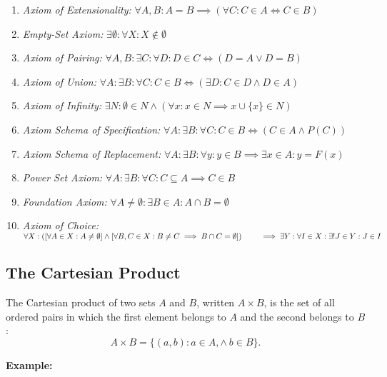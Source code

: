 \begin{enumerate}[label = \Roman*.]
	\item \emph{Axiom of Extensionality:} \quad \(\forall A, B: A = B \implies (\forall C: C \in A \iff C \in B)\)
	\item \emph{Empty-Set Axiom:} \quad \(\exists \emptyset : \forall X: X \notin \emptyset\)
	\item \emph{Axiom of Pairing:} \quad \(\forall A, B: \exists C: \forall D: D \in C \iff (D = A \lor D = B)\)
	\item \emph{Axiom of Union:} \quad \(\forall A: \exists B: \forall C: C \in B \iff (\exists D: C \in D \land D \in A)\)
	\item \emph{Axiom of Infinity:} \quad \(\exists N: \emptyset \in N \land (\forall x: x \in N \implies x \cup \{x\} \in N)\)
	\item \emph{Axiom Schema of Specification:} \quad \(\forall A: \exists B: \forall C: C \in B \iff (C \in A \land P(C))\)
	\item \emph{Axiom Schema of Replacement:} \quad \(\forall A: \exists B: \forall y: y \in B \implies \exists x \in A: y = F(x)\)
	\item \emph{Power Set Axiom:} \quad \(\forall A: \exists B: \forall C: C \subseteq A \implies C \in B\)
	\item \emph{Foundation Axiom:} \quad \(\forall A \ne \emptyset: \exists B \in A: A \cap B = \emptyset\)
	\item \emph{Axiom of Choice:} \quad \(\forall X:
		      \left( \left[ \forall A \in X: A \ne \emptyset \right] \land
		      \left[ \forall B, C \in X: B \ne C \implies B \cap C = \emptyset \right] \right) \\
		      \qquad \implies \exists Y: \forall I \in X: \exists! J \in Y: J \in I\)
\end{enumerate}

\subsection{The Cartesian Product}

The Cartesian product of two sets \(A\) and \(B\), written \(A \times B\), is the set of all ordered pairs in which the first element belongs to \(A\) and the second belongs to \(B\):
\[A \times B = \{ (a, b) : a \in A, \land\ b \in B\}.\]

\textbf{Example:}
\vspace{\baselineskip}

